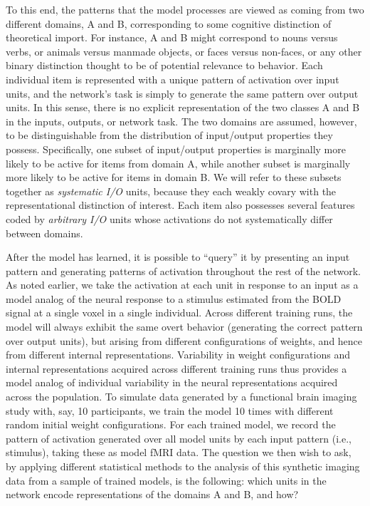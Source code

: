 To this end, the patterns that the model processes are viewed as coming from two different domains, A and B, corresponding to some cognitive distinction of theoretical import. For instance, A and B might correspond to nouns versus verbs, or animals versus manmade objects, or faces versus non-faces, or any other binary distinction thought to be of potential relevance to behavior. Each individual item is represented with a unique pattern of activation over input units, and the network's task is simply to generate the same pattern over output units. In this sense, there is no explicit representation of the two classes A and B in the inputs, outputs, or network task. The two domains are assumed, however, to be distinguishable from the distribution of input/output properties they possess. Specifically, one subset of input/output properties is marginally more likely to be active for items from domain A, while another subset is marginally more likely to be active for items in domain B. We will refer to these subsets together as {\em systematic I/O} units, because they each weakly covary with the representational distinction of interest.  Each item also possesses several features coded by {\em arbitrary I/O} units whose activations do not systematically differ between domains.

After the model has learned, it is possible to ``query'' it by presenting an input pattern and generating patterns of activation throughout the rest of the network. As noted earlier, we take the activation at each unit in response to an input as a model analog of the neural response to a stimulus estimated from the BOLD signal at a single voxel in a single individual. Across different training runs, the model will always exhibit the same overt behavior (generating the correct pattern over output units), but arising from different configurations of weights, and hence from different internal representations. Variability in weight configurations and internal representations acquired across different training runs thus provides a model analog of individual variability in the neural representations acquired across the population. To simulate data generated by a functional brain imaging study with, say, 10 participants, we train the model 10 times with different random initial weight configurations. For each trained model, we record the pattern of activation generated over all model units by each input pattern (i.e., stimulus), taking these as model fMRI data.  The question we then wish to ask, by applying different statistical methods to the analysis of this synthetic imaging data from a sample of trained models, is the following: which units in the network encode representations of the domains A and B, and how?

